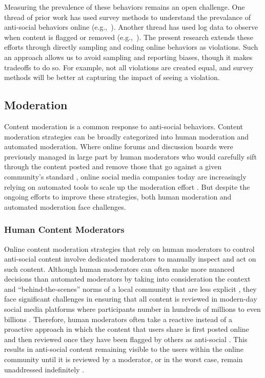 Measuring the prevalence of these behaviors remains an open challenge. One thread of prior work has used survey methods to understand the prevalance of anti-social behaviors online (e.g.,~\cite{pew_harassment_results,vitak_harassment}). Another thread has used log data to observe when content is flagged or removed (e.g.,~\cite{cheng2017anyone,twitch_transparency_report}). The present research extends these efforts through directly sampling and coding online behaviors as violations. Such an approach allows us to avoid sampling and reporting biases, though it makes tradeoffs to do so. For example, not all violations are created equal, and survey methods will be better at capturing the impact of seeing a violation.


\subsection{Moderation}
Content moderation is a common response to anti-social behaviors. Content moderation strategies can be broadly categorized into human moderation and automated moderation. Where online forums and discussion boards were previously managed in large part by human moderators who would carefully sift through the content posted and remove those that go against a given community's standard \cite{27_Lampe}, online social media companies today are increasingly relying on automated tools to scale up the moderation effort \cite{28_Gorwa, 29_Roberts}. But despite the ongoing efforts to improve these strategies, both human moderation and automated moderation face challenges.

\subsubsection{Human Content Moderators}
Online content moderation strategies that rely on human moderators to control anti-social content involve dedicated moderators to manually inspect and act on such content. Although human moderators can often make more nuanced decisions than automated moderators by taking into consideration the context \cite{28_Gorwa, 30_MSB, 31_Lessig, alkhatib2019street} and ``behind-the-scenes'' norms of a local community that are less explicit \cite{Chandrasekharan2018internet}, they face significant challenges in ensuring that all content is reviewed in modern-day social media platforms where participants number in hundreds of millions to even billions \cite{32_Preece, 33_Williams}. Therefore, human moderators often take a reactive instead of a proactive approach in which the content that users share is first posted online and then reviewed once they have been flagged by others as anti-social \cite{9_Roberts, 34_Gillespie}. This results in anti-social content remaining visible to the users within the online community until it is reviewed by a moderator, or in the worst case, remain unaddressed indefinitely \cite{34_Gillespie}. 

